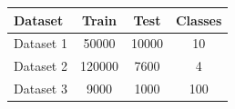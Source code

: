 \begin{tabular}{lS[table-format=6.0]S[table-format=5.0]S[table-format=3.0]}
  \toprule
  Dataset   & {Train} & {Test} & {Classes} \\
  \midrule
  Dataset 1 & 50000   & 10000  & 10        \\
  Dataset 2 & 120000  & 7600   & 4         \\
  Dataset 3 & 9000    & 1000   & 100       \\
  \bottomrule
\end{tabular}
